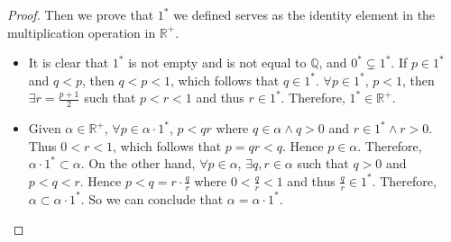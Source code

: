 \documentclass[onecolumn]{article}
\begin{document}
\begin{proof}
  Then we prove that $1^*$ we defined serves as the identity element in the 
  multiplication operation in $\mathbb{R^+}$.
  \begin{itemize}
    \item It is clear that $1^*$ is not empty and is not equal to $\mathbb{Q}$, 
    and $0^* \subsetneq 1^*$. If $p \in 1^*$ and $q < p$, then $q < p < 1$, 
    which follows that $q \in 1^*$. $\forall p \in 1^*$, $p < 1$, then 
    $\exists r = \frac{p+1}{2}$ such that $p < r < 1$ and thus $r \in 1^*$. 
    Therefore, $1^* \in \mathbb{R^+}$.
    \item Given $\alpha \in \mathbb{R^+}$, $\forall p \in \alpha \cdot 1^*$, 
    $p < qr$ where $q \in \alpha \wedge q > 0$ and $r \in 1^* \wedge r > 0$. 
    Thus $0 < r < 1$, which follows that $p = qr < q$. Hence $p \in \alpha$. 
    Therefore, $\alpha \cdot 1^* \subset \alpha$. On the other hand, 
    $\forall p \in \alpha$, $\exists q, r \in \alpha$ such that $q > 0$ and 
    $p < q < r$. Hence $p < q = r \cdot \frac{q}{r}$ where $0 < \frac{q}{r} < 1$ 
    and thus $\frac{q}{r} \in 1^*$. Therefore, $\alpha \subset \alpha \cdot 1^*$. 
    So we can conclude that $\alpha = \alpha \cdot 1^*$.
  \end{itemize}


\end{proof}
\end{document}
